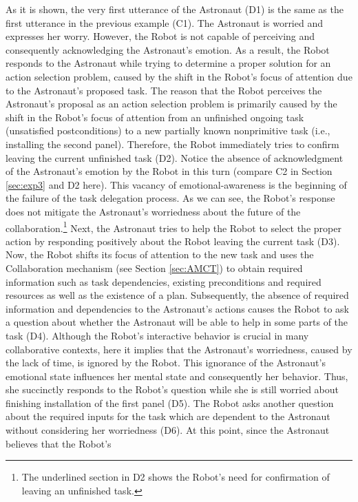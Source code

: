 As it is shown, the very first utterance of the Astronaut (D1) is the same as
the first utterance in the previous example (C1). The Astronaut is worried and
expresses her worry. However, the Robot is not capable of perceiving and
consequently acknowledging the Astronaut's emotion. As a result, the Robot
responds to the Astronaut while trying to determine a proper solution for an
action selection problem, caused by the shift in the Robot's focus of
attention due to the Astronaut's proposed task. The reason that the Robot
perceives the Astronaut's proposal as an action selection problem is primarily
caused by the shift in the Robot's focus of attention from an unfinished ongoing
task (unsatisfied postconditions) to a new partially known nonprimitive task
(i.e., installing the second panel). Therefore, the Robot immediately tries to
confirm leaving the current unfinished task (D2). Notice the absence of
acknowledgment of the Astronaut's emotion by the Robot in this turn (compare C2
in Section \ref{sec:exp3} and D2 here). This vacancy of emotional-awareness is
the beginning of the failure of the task delegation process. As we can see, the
Robot's response does not mitigate the Astronaut's worriedness about the future
of the collaboration.\footnote{The underlined section in D2 shows the Robot's
need for confirmation of leaving an unfinished task.} Next, the Astronaut tries
to help the Robot to select the proper action by responding positively about the
Robot leaving the current task (D3). Now, the Robot shifts its focus of
attention to the new task and uses the Collaboration mechanism (see Section
\ref{sec:AMCT}) to obtain required information such as task dependencies,
existing preconditions and required resources as well as the existence of a
plan. Subsequently, the absence of required information and dependencies to the
Astronaut's actions causes the Robot to ask a question about whether the
Astronaut will be able to help in some parts of the task (D4). Although the
Robot's interactive behavior is crucial in many collaborative contexts, here it
implies that the Astronaut's worriedness, caused by the lack of time, is ignored
by the Robot. This ignorance of the Astronaut's emotional state influences her
mental state and consequently her behavior. Thus, she succinctly responds to the
Robot's question while she is still worried about finishing installation of the
first panel (D5). The Robot asks another question about the required inputs for
the task which are dependent to the Astronaut without considering her
worriedness (D6). At this point, since the Astronaut believes that the Robot's
